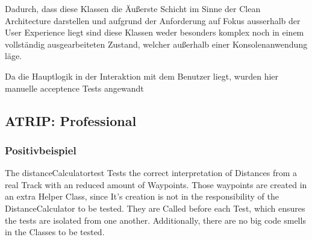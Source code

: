 Dadurch, dass diese Klassen die Äußerste Schicht im Sinne der Clean Architecture darstellen und aufgrund der Anforderung auf Fokus ausserhalb der User Experience liegt sind diese Klassen weder besonders komplex noch in einem vollständig ausgearbeiteten Zustand, welcher außerhalb einer Konsolenanwendung läge.

Da die Hauptlogik in der Interaktion mit dem Benutzer liegt, wurden hier manuelle acceptence Tests angewandt %

\subsection{ATRIP: Professional}

\subsubsection{Positivbeispiel}

The distanceCalculatortest Tests the correct interpretation of Distances from a real Track with an reduced amount of Waypoints.
 Those waypoints are created in an extra Helper Class, since It's creation is not in the responsibility of the DistanceCalculator to be tested. They are Called before each Test, which ensures the tests are isolated from one another.
Additionally, there are no big code smells in the Classes to be tested. 

